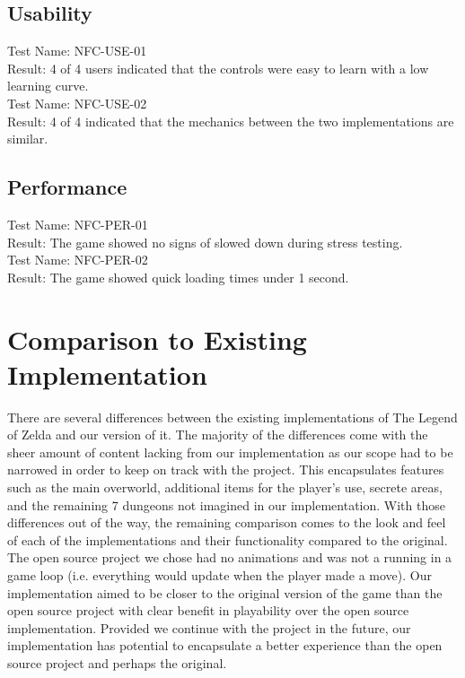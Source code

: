 \documentclass[12pt, titlepage]{article}
\begin{document}
\subsection{Usability}

Test Name: NFC-USE-01\\

Result: 4 of 4 users indicated that the controls were easy to learn with a low learning curve.\\

Test Name: NFC-USE-02\\

Result: 4 of 4 indicated that the mechanics between the two implementations are similar.\\

\subsection{Performance}

Test Name: NFC-PER-01\\

Result: The game showed no signs of slowed down during stress testing.\\

Test Name: NFC-PER-02\\

Result: The game showed quick loading times under 1 second.\\

\section{Comparison to Existing Implementation}	

There are several differences between the existing implementations of The Legend of Zelda and our version of it. The majority of the differences come with the sheer amount of content lacking from our implementation as our scope had to be narrowed in order to keep on track with the project. This encapsulates features such as the main overworld, additional items for the player's use, secrete areas, and the remaining 7 dungeons not imagined in our implementation. With those differences out of the way, the remaining comparison comes to the look and feel of each of the implementations and their functionality compared to the original. The open source project we chose had no animations and was not a running in a game loop (i.e. everything would update when the player made a move). Our implementation aimed to be closer to the original version of the game than the open source project with clear benefit in playability over the open source implementation. Provided we continue with the project in the future, our implementation has potential to encapsulate a better experience than the open source project and perhaps the original.
\end{document}
